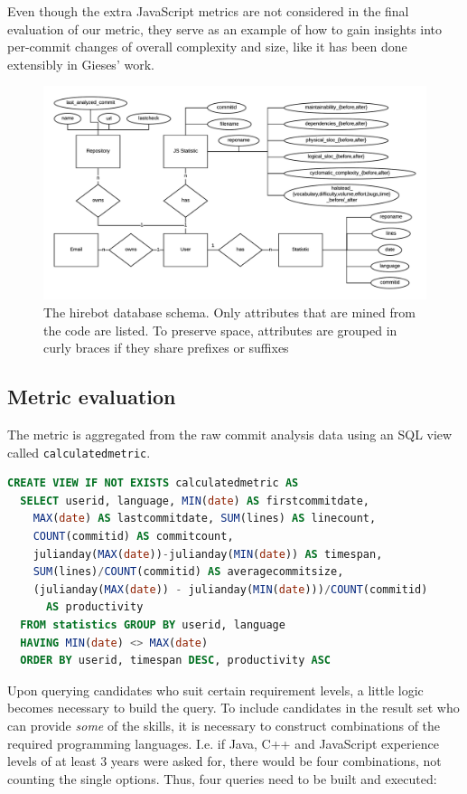 Even though the extra JavaScript metrics are not considered in the final evaluation of our metric, they serve as an example of how to gain insights into per-commit changes of overall complexity and size, like it has been done extensibly in Gieses' work\cite{pg:2014}.

\begin{figure}
  \centering
  \includegraphics[width=35em]{gfx/schema.png}
  \caption{The hirebot database schema. Only attributes that are mined from the code are listed. To preserve space, attributes are grouped in curly braces if they share prefixes or suffixes}
  \label{fig:schema}
\end{figure}

\subsection{Metric evaluation}
The metric is aggregated from the raw commit analysis data using an SQL view called \verb=calculatedmetric=.

\begin{lstlisting}[language=SQL, frame=false]
CREATE VIEW IF NOT EXISTS calculatedmetric AS
  SELECT userid, language, MIN(date) AS firstcommitdate,
    MAX(date) AS lastcommitdate, SUM(lines) AS linecount,
    COUNT(commitid) AS commitcount,
    julianday(MAX(date))-julianday(MIN(date)) AS timespan,
    SUM(lines)/COUNT(commitid) AS averagecommitsize,
    (julianday(MAX(date)) - julianday(MIN(date)))/COUNT(commitid)
      AS productivity
  FROM statistics GROUP BY userid, language
  HAVING MIN(date) <> MAX(date)
  ORDER BY userid, timespan DESC, productivity ASC
\end{lstlisting}

Upon querying candidates who suit certain requirement levels, a little logic becomes necessary to build the query. To include candidates in the result set who can provide \textit{some} of the skills, it is necessary to construct combinations of the required programming languages. I.e. if Java, C++ and JavaScript experience levels of at least 3 years were asked for, there would be four combinations, not counting the single options.
Thus, four queries need to be built and executed:

